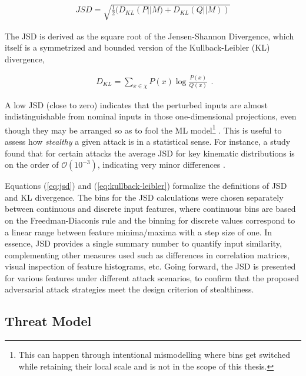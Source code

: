 \begin{equation}
\begin{split}
JSD = \sqrt{\frac{1}{2} ( D_{KL}\left( P \vert\vert M)+D_{KL}(Q \vert\vert M)\right)}
\end{split}
\label{eq:jsd}
\end{equation}

The JSD is derived as the square root of the Jensen-Shannon Divergence, which itself is a symmetrized and bounded version of the Kullback-Leibler (KL) divergence,

\begin{equation}
\begin{split}
D_{KL}=\sum_{x\in\chi} P(x) \log{\frac{P(x)}{Q(x)}}
\end{split}
\label{eq:kullback-leibler}.
\end{equation}

A low JSD (close to zero) indicates that the perturbed inputs are almost indistinguishable from nominal inputs in those one-dimensional projections, even though they may be arranged so as to fool the ML  model\footnote{This can happen through intentional mismodelling where bins get switched while retaining their local scale and is not in the scope of this thesis.} \cite{saala2025enforcingfundamentalrelationsadversarial}. This is useful to assess how \textit{stealthy} a given attack is in a statistical sense. For instance, a study found that for certain attacks the average JSD for key kinematic distributions is on the order of $\mathcal{O}(10^{-3})$, indicating very minor differences \cite{saala2025enforcingfundamentalrelationsadversarial}. 

Equations (\ref{eq:jsd}) and (\ref{eq:kullback-leibler}) formalize the definitions of JSD and KL divergence. The bins for the JSD calculations were chosen separately between continuous and discrete input features, where continuous bins are based on the Freedman-Diaconis rule \cite{Freedman1981} and the binning for discrete values correspond to a linear range between feature minima/maxima with a step size of one. In essence, JSD provides a single summary number to quantify input similarity, complementing other measures used such as differences in correlation matrices, visual inspection of feature histograms, etc. Going forward, the JSD is presented for various features under different attack scenarios, to confirm that the proposed adversarial attack strategies meet the design criterion of stealthiness.

\subsection*{Threat Model}

